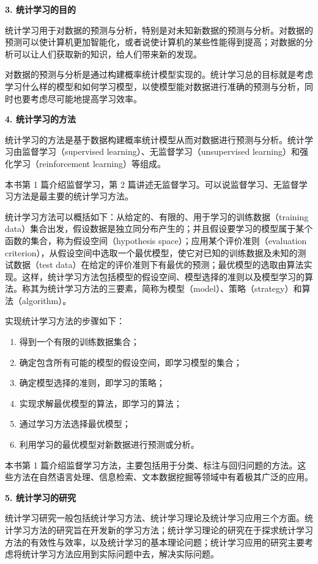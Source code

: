 \documentclass[UTF8, 12pt, fontset=fandol, oneside]{ctexart}
\begin{document}
\noindent\textbf{3. 统计学习的目的}

统计学习用于对数据的预测与分析，特别是对未知新数据的预测与分析。对数据的预测可以使计算机更加智能化，或者说使计算机的某些性能得到提高；对数据的分析可以让人们获取新的知识，给人们带来新的发现。

对数据的预测与分析是通过构建概率统计模型实现的。统计学习总的目标就是考虑学习什么样的模型和如何学习模型，以使模型能对数据进行准确的预测与分析，同时也要考虑尽可能地提高学习效率。

\noindent\textbf{4. 统计学习的方法}

统计学习的方法是基于数据构建概率统计模型从而对数据进行预测与分析。统计学习由监督学习（supervised learning）、无监督学习（unsupervised learning）和强化学习（reinforcement learning）等组成。

本书第 1 篇介绍监督学习，第 2 篇讲述无监督学习。可以说监督学习、无监督学习方法是最主要的统计学习方法。

统计学习方法可以概括如下：从给定的、有限的、用于学习的训练数据（training data）集合出发，假设数据是独立同分布产生的；并且假设要学习的模型属于某个函数的集合，称为假设空间（hypothesis space）；应用某个评价准则（evaluation criterion），从假设空间中选取一个最优模型，使它对已知的训练数据及未知的测试数据（test data）在给定的评价准则下有最优的预测；最优模型的选取由算法实现。这样，统计学习方法包括模型的假设空间、模型选择的准则以及模型学习的算法。称其为统计学习方法的三要素，简称为模型（model）、策略（strategy）和算法（algorithm）。

实现统计学习方法的步骤如下：
\begin{enumerate}
  \item 得到一个有限的训练数据集合；
  \item 确定包含所有可能的模型的假设空间，即学习模型的集合；
  \item 确定模型选择的准则，即学习的策略；
  \item 实现求解最优模型的算法，即学习的算法；
  \item 通过学习方法选择最优模型；
  \item 利用学习的最优模型对新数据进行预测或分析。
\end{enumerate}

本书第 1 篇介绍监督学习方法，主要包括用于分类、标注与回归问题的方法。这些方法在自然语言处理、信息检索、文本数据挖掘等领域中有着极其广泛的应用。

\noindent\textbf{5. 统计学习的研究}

统计学习研究一般包括统计学习方法、统计学习理论及统计学习应用三个方面。统计学习方法的研究旨在开发新的学习方法；统计学习理论的研究在于探求统计学习方法的有效性与效率，以及统计学习的基本理论问题；统计学习应用的研究主要考虑将统计学习方法应用到实际问题中去，解决实际问题。
\end{document}
